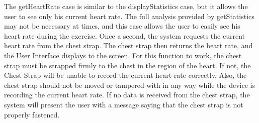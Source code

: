 \documentclass[letterpaper,english, 12pt]{scrreprt}
\begin{document}
The getHeartRate case is similar to the displayStatistics case, but it allows the user to see only his current heart rate. The full analysis provided by getStatistics may not be necessary at times, and this case allows the user to easily see his heart rate during the exercise.
Once a second, the system requests the current heart rate from the chest strap. The chest strap then returns the heart rate, and the User Interface displays to the screen.
For this function to work, the chest strap must be strapped firmly to the chest in the region of the heart. If not, the Chest Strap will be unable to record the current heart rate correctly. Also, the chest strap should not be moved or tampered with in any way while the device is recording the current heart rate.
If no data is received from the chest strap, the system will present the user with a message saying that the chest strap is not properly fastened. \pagebreak
\end{document}
